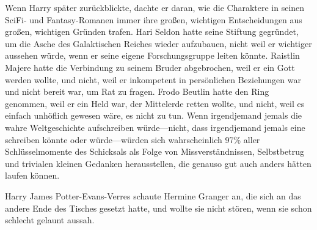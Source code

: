 Wenn Harry später zurückblickte, dachte er daran, wie die Charaktere in seinen SciFi- und Fantasy-Romanen immer ihre großen, wichtigen Entscheidungen aus großen, wichtigen Gründen trafen. Hari Seldon hatte seine Stiftung gegründet, um die Asche des Galaktischen Reiches wieder aufzubauen, nicht weil er wichtiger aussehen würde, wenn er seine eigene Forschungsgruppe leiten könnte. Raistlin Majere hatte die Verbindung zu seinem Bruder abgebrochen, weil er ein Gott werden wollte, und nicht, weil er inkompetent in persönlichen Beziehungen war und nicht bereit war, um Rat zu fragen. Frodo Beutlin hatte den Ring genommen, weil er ein Held war, der Mittelerde retten wollte, und nicht, weil es einfach unhöflich gewesen wäre, es nicht zu tun. Wenn irgendjemand jemals die wahre Weltgeschichte aufschreiben würde—nicht, dass irgendjemand jemals eine schreiben könnte oder würde—würden sich wahrscheinlich 97\% aller Schlüsselmomente des Schicksals als Folge von Missverständnissen, Selbstbetrug und trivialen kleinen Gedanken herausstellen, die genauso gut auch anders hätten laufen können.%

Harry James Potter-Evans-Verres schaute Hermine Granger an, die sich an das andere Ende des Tisches gesetzt hatte, und wollte sie nicht stören, wenn sie schon schlecht gelaunt aussah.

